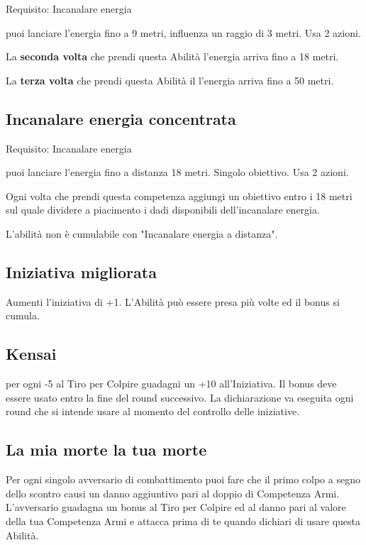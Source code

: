 \documentclass[a4paper,11pt,twoside,openany]{book}
\begin{document}
Requisito: Incanalare energia

puoi lanciare l'energia fino a 9 metri, influenza un raggio di 3 metri. Usa 2 azioni.

La \textbf{seconda volta} che prendi questa Abilità l'energia arriva fino a 18 metri.

La \textbf{terza volta} che prendi questa Abilità il l'energia arriva fino a 50 metri.

\subsection{Incanalare energia concentrata}

Requisito: Incanalare energia

puoi lanciare l'energia fino a distanza 18 metri. Singolo obiettivo. Usa 2 azioni.

Ogni volta che prendi questa competenza aggiungi un obiettivo entro i 18 metri sul quale dividere a piacimento i dadi disponibili dell'incanalare energia.

L'abilità non è cumulabile con "Incanalare energia a distanza".

\subsection{Iniziativa migliorata}

Aumenti l'iniziativa di +1. L'Abilità può essere presa più volte ed il bonus si cumula.

\subsection{Kensai}

per ogni -5 al Tiro per Colpire guadagni un +10 all'Iniziativa. Il bonus deve essere usato entro la fine del round successivo. La dichiarazione va eseguita ogni round che si intende usare al momento del controllo delle iniziative.

\subsection{La mia morte la tua morte}

Per ogni singolo avversario di combattimento puoi fare che il primo colpo a segno dello scontro causi un danno aggiuntivo pari al doppio di Competenza Armi. L'avversario guadagna un bonus al Tiro per Colpire ed al danno pari al valore della tua Competenza Armi e attacca prima di te quando dichiari di usare questa Abilità.
\end{document}
